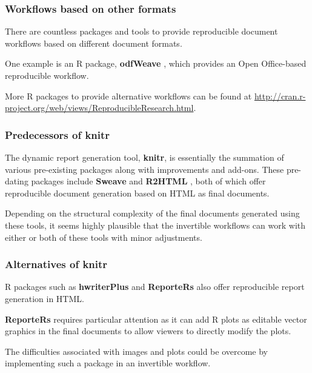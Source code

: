 \documentclass[a4paper, 12pt]{report}
\begin{document}
\subsubsection*{Workflows based on other formats}
There are countless packages and tools to provide reproducible document workflows based on different document formats.

One example is an R package, \textbf{odfWeave} \citep{odfweave}, which provides an Open Office-based reproducible workflow.

More R packages to provide alternative workflows can be found at \url{http://cran.r-project.org/web/views/ReproducibleResearch.html}.


\subsubsection*{Predecessors of knitr}
The dynamic report generation tool, \textbf{knitr}, is essentially the summation of various pre-existing packages along with improvements and add-ons. These pre-dating packages include \textbf{Sweave} \citep{sweave} and \textbf{R2HTML} \citep{r2html}, both of which offer reproducible document generation based on HTML as final documents.

Depending on the structural complexity of the final documents generated using these tools, it seems highly plausible that the invertible workflows can work with either or both of these tools with minor adjustments.


\subsubsection*{Alternatives of knitr}
R packages such as \textbf{hwriterPlus} \citep{hwriterplus} and \textbf{ReporteRs} \citep{reporters} also offer reproducible report generation in HTML.

\textbf{ReporteRs} requires particular attention as it can add R plots as editable vector graphics in the final documents to allow viewers to directly modify the plots.

The difficulties associated with images and plots could be overcome by implementing such a package in an invertible workflow.





\end{document}
